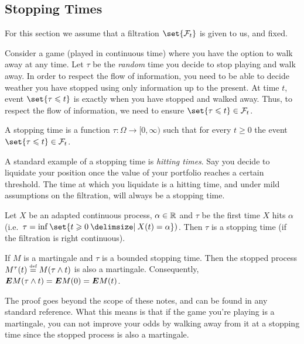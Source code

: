 \subsection{Stopping Times}

For this section we assume that a filtration $\set{\mathcal F_t}$ is given to us, and fixed.

Consider a game (played in continuous time) where you have the option to walk away at any time.
Let $\tau$ be the \emph{random} time you decide to stop playing and walk away.
In order to respect the flow of information, you need to be able to decide weather you have stopped using only information up to the present.
At time $t$, event $\set{\tau \leq t}$ is exactly when you have stopped and walked away.
Thus, to respect the flow of information, we need to ensure $\set{\tau \leq t} \in \mathcal F_t$.

\begin{definition}
  A stopping time is a function $\tau\colon \Omega \to [0, \infty)$ such that for every $t \geq 0$ the event $\set{\tau \leq t} \in \mathcal F_t$.
\end{definition}

A standard example of a stopping time is \emph{hitting times}.
Say you decide to liquidate your position once the value of your portfolio reaches a certain threshold.
The time at which you liquidate is a hitting time, and under mild assumptions on the filtration, will always be a stopping time.

\begin{definition}
  Let $X$ be an adapted continuous process, $\alpha \in \mathbb{R}$ and $\tau$ be the first time $X$ hits $\alpha$ (i.e.\ $\tau  = \inf\set{t \geq 0 \st X(t) = \alpha })$.
  Then $\tau$ is a stopping time (if the filtration is right continuous).
\end{definition}

\begin{theorem}
  If $M$ is a martingale and $\tau$ is a bounded stopping time.
  Then the stopped process $M^\tau(t) \stackrel{\scriptscriptstyle\textup{def}}{=} M(\tau \wedge t)$ is also a martingale.
  Consequently, $\bm{E} M(\tau \wedge t) = \bm{E} M(0) = \bm{E} M(t)$.
\end{theorem}

The proof goes beyond the scope of these notes, and can be found in any standard reference.
What this means is that if the game you're playing is a martingale, you can not improve your odds by walking away from it at a stopping time since the stopped process is also a martingale.


